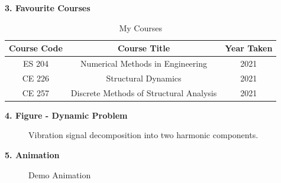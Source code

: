 \documentclass[12pt,a4paper]{article}
\begin{document}
\noindent \textbf{3. Favourite Courses}
\begin{table} [htb]
  \begin{center}
    \caption{My Courses}
    {\begin{tabular} [t] {ccc}
        \hline
        \textbf{Course Code} & \textbf{Course Title}                   & \textbf{Year Taken} \\
        \hline
        ES 204               & Numerical Methods in Engineering        & 2021                \\
        CE 226               & Structural Dynamics                     & 2021                \\
        CE 257               & Discrete Methods of Structural Analysis & 2021                \\
      \end{tabular}}
  \end{center}
\end{table}

\newpage

\textbf{4. Figure - Dynamic Problem}
\begin{figure} [!h]
  \begin{center}
    \caption{Vibration signal decomposition into two harmonic components.}
    \label{image}
  \end{center}
\end{figure}
\bigskip

\textbf{5. Animation}
\begin{figure} [!h]
  \begin{center}
    \caption{Demo Animation}
    \label{demoanimation}
  \end{center}
\end{figure}
\bigskip
\end{document}

